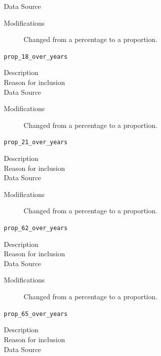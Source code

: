 \documentclass{article}
\begin{document}
\begin{itemize}[label={}, align=left]
\begin{description}
              \item[Data Source] \cite{acs_demographics_data}
              \item[Modifications] Changed from a percentage to a proportion.
          \end{description}
    \item[\texttt{prop\_18\_over\_years}] \
          \begin{description}
              \item[Description] 
              \item[Reason for inclusion] \agereason
              \item[Data Source] \cite{acs_demographics_data}
              \item[Modifications] Changed from a percentage to a proportion.
          \end{description}
    \item[\texttt{prop\_21\_over\_years}] \
          \begin{description}
              \item[Description] 
              \item[Reason for inclusion] \agereason
              \item[Data Source] \cite{acs_demographics_data}
              \item[Modifications] Changed from a percentage to a proportion.
          \end{description}
    \item[\texttt{prop\_62\_over\_years}] \
          \begin{description}
              \item[Description] 
              \item[Reason for inclusion] \agereason
              \item[Data Source] \cite{acs_demographics_data}
              \item[Modifications] Changed from a percentage to a proportion.
          \end{description}
    \item[\texttt{prop\_65\_over\_years}] \
          \begin{description}
              \item[Description] \agedescover{65}
              \item[Reason for inclusion] \agereason
              \item[Data Source] \cite{acs_demographics_data}

\end{description}
\end{itemize}
\end{document}
